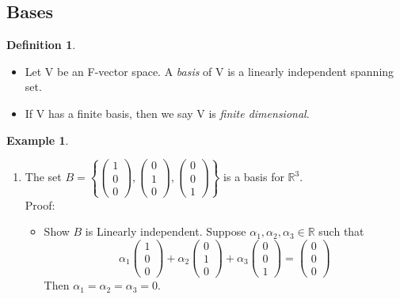 \documentclass{report}
\theoremstyle{remark}
\theoremstyle{definition}
\newtheorem{definition}[theorem]{Definition}
\theoremstyle{definition}
\newtheorem{example}[theorem]{Example}
\theoremstyle{theorem}
\begin{document}
\subsection{Bases}
\begin{definition}
\begin{itemize}
    \item Let V be an F-vector space. A \emph{basis} of V is a linearly independent spanning set.
    \item If V has a finite basis, then we say V is \emph{finite dimensional}.
\end{itemize}
\end{definition}
\begin{example}
\begin{enumerate}
    \item The set $B = \left\{ \begin{pmatrix}1\\0\\0\end{pmatrix}, \begin{pmatrix}0\\1\\0\end{pmatrix}, \begin{pmatrix}0\\0\\1\end{pmatrix} \right\}$ is a basis for $\mathbb{R}^3$. \\
    Proof: \begin{itemize}
        \item Show $B$ is Linearly independent. Suppose $\alpha_1, \alpha_2, \alpha_3 \in \mathbb{R}$ such that 
        \[\alpha_1\begin{pmatrix}1\\0\\0\end{pmatrix} + \alpha_2\begin{pmatrix}0\\1\\0\end{pmatrix} + \alpha_3\begin{pmatrix}0\\0\\1\end{pmatrix} = \begin{pmatrix}0\\0\\0\end{pmatrix} \]
        Then $\alpha_1 = \alpha_2 = \alpha_3 = 0$.

\end{itemize}
\end{enumerate}
\end{example}
\end{document}
